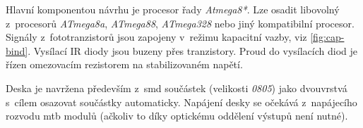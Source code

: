 Hlavní komponentou návrhu je procesor řady \textit{Atmega8*}. Lze osadit
libovolný z~procesorů \textit{ATmega8a}, \textit{ATmega88}, \textit{ATmega328}
nebo jiný kompatibilní procesor. Signály z~fototranzistorů jsou zapojeny
v~režimu kapacitní vazby, viz \ref{fig:cap-bind}. Vysílací IR diody jsou buzeny
přes tranzistory.  Proud do vysílacích diod je řízen omezovacím rezistorem na
stabilizovaném napětí.

Deska je navržena především z~\gls{smd} součástek (velikosti \textit{0805})
jako dvouvrstvá s~cílem osazovat součástky automaticky. Napájení desky se
očekává z~napájecího rozvodu \gls{mtb} modulů (ačkoliv to díky optickému
oddělení výstupů není nutné).
